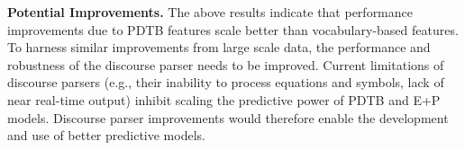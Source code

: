 \documentclass[letterpaper]{article}
\begin{document}


\textbf{Potential Improvements.} The above results indicate that performance 
improvements due to PDTB features scale better than vocabulary-based features.
To harness similar improvements from large scale data, the performance and 
robustness of the discourse parser needs to be improved. Current limitations 
of discourse parsers (e.g., their inability to process equations and symbols, 
lack of near real-time output) inhibit scaling the predictive power of PDTB 
and E+P models. Discourse parser improvements would therefore enable the 
development and use of better predictive models.
\end{document}
